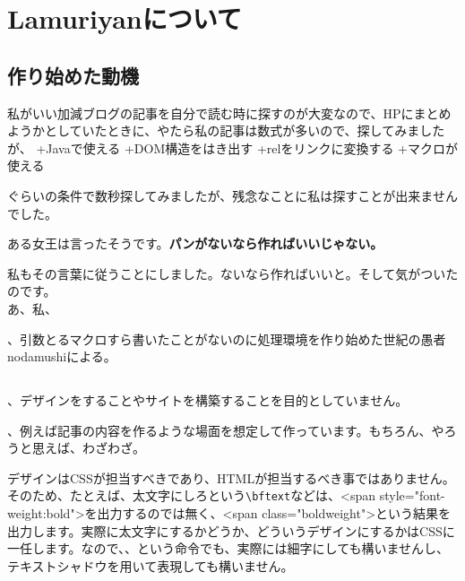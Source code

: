 \chapter{Lamuriyanについて}
\label{sec:aboutlamuriyan}
\chapternav

\section{作り始めた動機}
\label{sec:motivation}
  私がいい加減ブログの記事を自分で読む時に探すのが大変なので、HPにまとめようかとしていたときに、やたら私の記事は数式が多いので、探してみましたが、
+Javaで使える
+DOM構造をはき出す
+relをリンクに変換する
+マクロが使える

ぐらいの条件で数秒探してみましたが、残念なことに私は探すことが出来ませんでした。

ある女王は言ったそうです。\textbf{\color{*5c9}パンがないなら作ればいいじゃない。}

私もその言葉に従うことにしました。ないなら作ればいいと。そして気がついたのです。\\[4em]

{\large あ、私、}

、引数とるマクロすら書いたことがないのに処理環境を作り始めた世紀の愚者nodamushiによる。



\section{}
、{\color{red}デザインをすることやサイトを構築することを目的としていません。}

、例えば{\color{*f65}記事の内容を作るような場面}を想定して作っています。もちろん、やろうと思えば、わざわざ。

デザインはCSSが担当すべきであり、HTMLが担当するべき事ではありません。そのため、たとえば、太文字にしろという\verb+\bftext+などは、<span style="font-weight:bold">を出力するのでは無く、<span class="boldweight">という結果を出力します。実際に太文字にするかどうか、どういうデザインにするかはCSSに一任します。なので、、という命令でも、実際には細字にしても構いませんし、テキストシャドウを用いて表現しても構いません。

